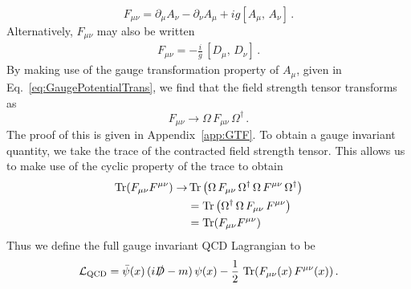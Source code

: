 %
\begin{equation}
F_{\mu\nu}=\partial_\mu A_\nu - \partial_\nu A_\mu + ig[A_\mu,\,A_\nu]\, .
\label{eq:FieldStrengthTensor}
\end{equation}
%
Alternatively, $F_{\mu\nu}$ may also be written
%
\begin{align}
F_{\mu\nu} = -\frac{i}{g}\,[D_\mu,\, D_\nu]\, .
\end{align}
%
By making use of the gauge transformation property of $A_\mu$, given in Eq.~\eqref{eq:GaugePotentialTrans}, we find that the field strength tensor transforms as
%
\begin{equation}
F_{\mu\nu}\rightarrow \Omega\,F_{\mu\nu}\, \Omega^\dagger\, .
\end{equation}
%
The proof of this is given in Appendix~\ref{app:GTF}. To obtain a gauge invariant quantity, we take the trace of the contracted field strength tensor. This allows us to make use of the cyclic property of the trace to obtain
%
\begin{align*}
\operatorname{Tr}(F_{\mu\nu}F^{\mu\nu})\rightarrow &\operatorname{Tr}\left(\Omega\,F_{\mu\nu}\, \Omega^\dagger\,\Omega\,F^{\mu\nu}\, \Omega^\dagger\right)\\
&=\operatorname{Tr}\left(\Omega^\dagger \, \Omega\,F_{\mu\nu}\,F^{\mu\nu}\right)\\
&=\operatorname{Tr}(F_{\mu\nu}F^{\mu\nu})
\end{align*}
Thus we define the full gauge invariant QCD Lagrangian to be
%
\begin{equation}
\mathcal{L_{\text{QCD}}}=\bar{\psi}(x)\,(i\slashed{D}-m)\,\psi(x)-\frac{1}{2}\,\operatorname{Tr}(F_{\mu\nu}(x)\,F^{\mu\nu}(x))\, .
\label{eq:QCDLagrangian}
\end{equation}\\

